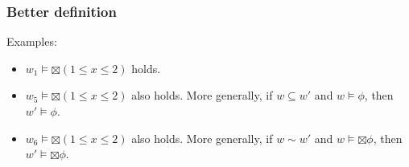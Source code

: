 \begin{frame}[fragile]
    \frametitle{Better definition}

    
Examples:
\begin{itemize}
    \item $w_1 \models \boxtimes (1 \leq x \leq 2)$ holds.
    \item $w_5 \models \boxtimes (1 \leq x \leq 2)$ also holds. More generally, if $w \subseteq w'$ and $w \models \phi$, then $w' \models \phi$.
    \item $w_6 \models \boxtimes (1 \leq x \leq 2)$ also holds. More generally, if $w \sim w'$ and $w \models \boxtimes\phi$, then $w' \models \boxtimes\phi$.
\end{itemize}

\end{frame}

